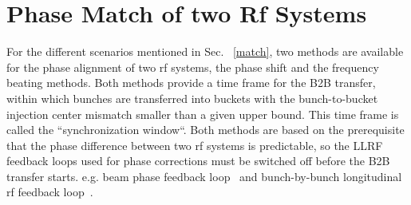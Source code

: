 
%

  
\section{Phase Match of two Rf Systems}
\label{two_sync_methods}
For the different scenarios mentioned in Sec. ~\ref{match}, two methods are available for the phase alignment of two rf systems, the phase shift and the frequency beating methods. Both methods provide a time frame for the B2B transfer, within which bunches are transferred into buckets with the bunch-to-bucket injection center mismatch smaller than a given upper bound. This time frame is called the ``synchronization window``. Both methods are based on the prerequisite that the phase difference between two rf systems is predictable, so the LLRF feedback loops used for phase corrections must be switched off before the B2B transfer starts. e.g. beam phase feedback loop~\cite{grieser_beam_2015} and bunch-by-bunch longitudinal rf feedback loop~\cite{gross_bunch-by-bunch_2015}.


